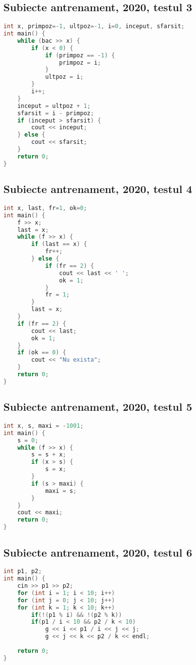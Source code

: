\documentclass[10pt, a4paper, twocolumn]{article}
\begin{document}
\subsection*{Subiecte antrenament, 2020, testul 3}
\begin{lstlisting}[language=C++]
int x, primpoz=-1, ultpoz=-1, i=0, inceput, sfarsit;
int main() {
    while (bac >> x) {
        if (x < 0) {
            if (primpoz == -1) {
                primpoz = i;
            }
            ultpoz = i;
        }
        i++;
    }
    inceput = ultpoz + 1;
    sfarsit = i - primpoz;
    if (inceput > sfarsit) {
        cout << inceput;
    } else {
        cout << sfarsit;
    }
    return 0;
}
\end{lstlisting}
\vspace{0.5cm}

\subsection*{Subiecte antrenament, 2020, testul 4}
\begin{lstlisting}[language=C++]
int x, last, fr=1, ok=0;
int main() {
    f >> x;
    last = x;
    while (f >> x) {
        if (last == x) {
            fr++;
        } else {
            if (fr == 2) {
                cout << last << ' ';
                ok = 1;
            }
            fr = 1;
        }
        last = x;
    }
    if (fr == 2) {
        cout << last;
        ok = 1;
    }
    if (ok == 0) {
        cout << "Nu exista";
    }
    return 0;
}
\end{lstlisting}
\vspace{0.5cm}

\subsection*{Subiecte antrenament, 2020, testul 5}
\begin{lstlisting}[language=C++]
int x, s, maxi = -1001;
int main() {
    s = 0;
    while (f >> x) {
        s = s + x;
        if (x > s) {
            s = x;
        }
        if (s > maxi) {
            maxi = s;
        }
    }
    cout << maxi;
    return 0;
}
\end{lstlisting}

\subsection*{Subiecte antrenament, 2020, testul 6}
\begin{lstlisting}[language=C++]
int p1, p2;
int main() {
    cin >> p1 >> p2;
    for (int i = 1; i < 10; i++)
    for (int j = 0; j < 10; j++)
    for (int k = 1; k < 10; k++)
        if(!(p1 % i) && !(p2 % k))
        if(p1 / i < 10 && p2 / k < 10)
            g << i << p1 / i << j << j;
            g << j << k << p2 / k << endl;
    
    return 0;
}
\end{lstlisting}
\vspace{0.5cm}
\end{document}
